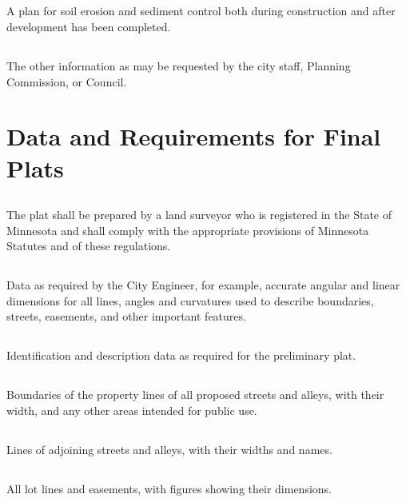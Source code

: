 \subsection{}
A plan for soil erosion and sediment control both during construction and after development has been completed.
\subsection{}
The other information as may be requested by the city staff, Planning Commission, or Council.

\section{Data and Requirements for Final Plats}
\subsection{}
The plat shall be prepared by a land surveyor who is registered in the State of Minnesota and shall comply with the appropriate provisions of Minnesota Statutes and of these regulations.
\subsection{}
Data as required by the City Engineer, for example, accurate angular and linear dimensions for all lines, angles and curvatures used to describe boundaries, streets, easements, and other important features.
\subsection{}
Identification and description data as required for the preliminary plat.
\subsection{}
Boundaries of the property lines of all proposed streets and alleys, with their width, and any other areas intended for public use.
\subsection{}
Lines of adjoining streets and alleys, with their widths and names.
\subsection{}
All lot lines and easements, with figures showing their dimensions.
